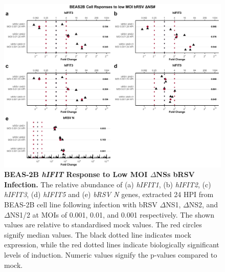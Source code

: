 \begin{figure}
    \centering
    \includegraphics[width=1\linewidth]{06. Chapter 1/Figs/01. Induction/12. beas2b_brsv_dns.pdf}
    \caption[BEAS-2B \textit{hIFIT} Response to Low MOI \(\Delta\)NSs bRSV Infection.]{\textbf{BEAS-2B \textit{hIFIT} Response to Low MOI \(\Delta\)NSs bRSV Infection.} The relative abundance of (a) \textit{hIFIT1}, (b) \textit{hIFIT2}, (c) \textit{hIFIT3}, (d) \textit{hIFIT5} and (e) \textit{bRSV N} genes, extracted 24 HPI from BEAS-2B cell line following infection with bRSV \(\Delta\)NS1, \(\Delta\)NS2, and \(\Delta\)NS1/2 at MOIs of 0.001, 0.01, and 0.001 respectively. The shown values are relative to standardised mock values. The red circles signify median values. The black dotted line indicates mock expression, while the red dotted lines indicate biologically significant levels of induction. Numeric values signify the p-values compared to mock.}
    \label{BEAS-2B responses to bRSV dNSs.}
\end{figure}


